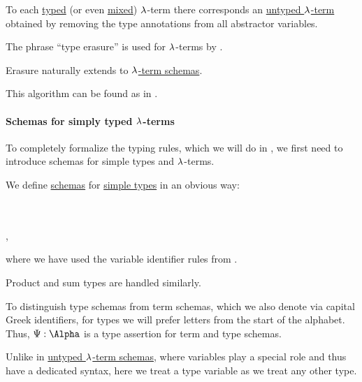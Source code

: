\begin{algorithm}\label{alg:type_erasure}
  To each \hyperref[def:typed_lambda_term]{typed} (or even \hyperref[rem:mixed_lambda_term]{mixed}) \( {\mathrm \lambda} \)-term there corresponds an \hyperref[def:lambda_term]{untyped \( {\mathrm \lambda} \)-term} obtained by removing the type annotations from all abstractor variables.
\end{algorithm}
\begin{comments}
  \item The phrase \enquote{type erasure} is used for \( {\mathrm \lambda} \)-terms by .
  \item Erasure naturally extends to \hyperref[def:simple_type_schema]{\( {\mathrm \lambda} \)-term schemas}.
  \item This algorithm can be found as  in \cite{notebook:code}.
\end{comments}

\paragraph{Schemas for simply typed \( {\mathrm \lambda} \)-terms}

To completely formalize the typing rules, which we will do in , we first need to introduce schemas for simple types and \( {\mathrm \lambda} \)-terms.

\begin{definition}\label{def:simple_type_schema}
  We define \hyperref[con:schemas_and_instances]{schemas} for \hyperref[def:simple_type]{simple types} in an obvious way:
  \begin{bnf*}
        {} \\
       {\bnftsq{(} \bnfsp {} \bnfsp \bnftsq{\( \synimplies \)} \bnfsp {} \bnfsp \bnftsq{)}} \\
             { \bnfor {} \bnfor {}},
  \end{bnf*}
  where we have used the variable identifier rules from .

  Product and sum types are handled similarly.
\end{definition}
\begin{comments}
  \item To distinguish type schemas from term schemas, which we also denote via capital Greek identifiers, for types we will prefer letters from the start of the alphabet. Thus, \( \Psi: \Alpha \) is a type assertion for term and type schemas.

  \item Unlike in \hyperref[def:lambda_term_schema]{untyped \( {\mathrm \lambda} \)-term schemas}, where variables play a special role and thus have a dedicated syntax, here we treat a type variable as we treat any other type.
\end{comments}

